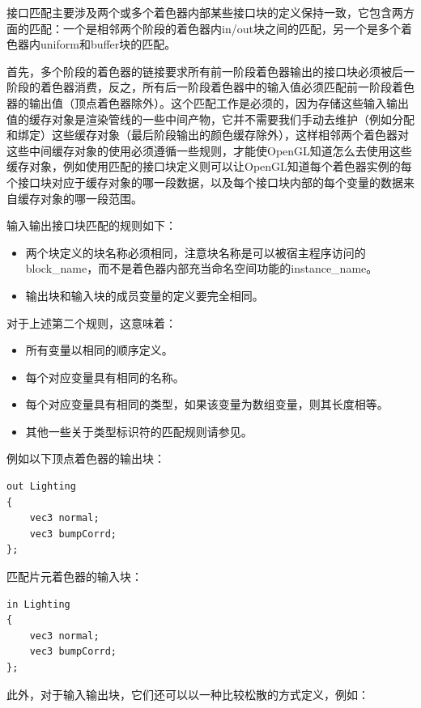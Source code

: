 接口匹配主要涉及两个或多个着色器内部某些接口块的定义保持一致，它包含两方面的匹配：一个是相邻两个阶段的着色器内in/out块之间的匹配，另一个是多个着色器内uniform和buffer块的匹配。

首先，多个阶段的着色器的链接要求所有前一阶段着色器输出的接口块必须被后一阶段的着色器消费，反之，所有后一阶段着色器中的输入值必须匹配前一阶段着色器的输出值（顶点着色器除外）。这个匹配工作是必须的，因为存储这些输入输出值的缓存对象是渲染管线的一些中间产物，它并不需要我们手动去维护（例如分配和绑定）这些缓存对象（最后阶段输出的颜色缓存除外），这样相邻两个着色器对这些中间缓存对象的使用必须遵循一些规则，才能使OpenGL知道怎么去使用这些缓存对象，例如使用匹配的接口块定义则可以让OpenGL知道每个着色器实例的每个接口块对应于缓存对象的哪一段数据，以及每个接口块内部的每个变量的数据来自缓存对象的哪一段范围。

输入输出接口块匹配的规则如下：

\begin{itemize}
	\item 两个块定义的块名称必须相同，注意块名称是可以被宿主程序访问的block\_name，而不是着色器内部充当命名空间功能的instance\_name。
	\item 输出块和输入块的成员变量的定义要完全相同。

\end{itemize}

对于上述第二个规则，这意味着：

\begin{itemize}
	\item 所有变量以相同的顺序定义。
	\item 每个对应变量具有相同的名称。
	\item 每个对应变量具有相同的类型，如果该变量为数组变量，则其长度相等。
	\item 其他一些关于类型标识符的匹配规则请参见\cite{b:OpenGL4.5CoreProfile}。
\end{itemize}

例如以下顶点着色器的输出块：

\begin{lstlisting}
out Lighting 
{
	vec3 normal;
	vec3 bumpCorrd;
};
\end{lstlisting}

匹配片元着色器的输入块：

\begin{lstlisting}
in Lighting 
{
	vec3 normal;
	vec3 bumpCorrd;
};
\end{lstlisting}


此外，对于输入输出块，它们还可以以一种比较松散的方式定义，例如：

